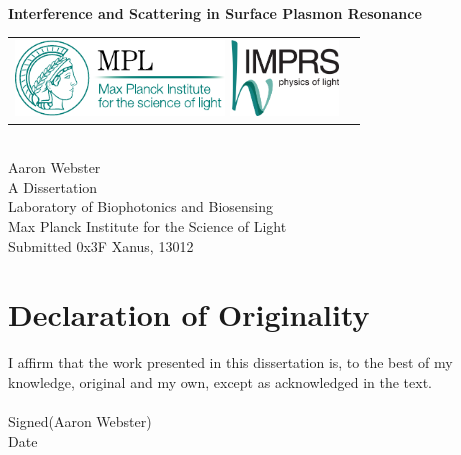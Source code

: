 \documentclass[a4paper]{report}
\begin{document}
\begin{titlepage}
\begin{center}
\hfill\\[4cm]
{ \Huge {\bfseries {Interference and Scattering in Surface Plasmon Resonance}} \par}
\vspace{3.0cm}
\begin{tabular}{lr}
\includegraphics[height=2cm,keepaspectratio]{logo/Logo_MPL_englisch_kompakt_cmyk_110915}
\hspace{1.0cm}
%
\includegraphics[height=2cm,keepaspectratio]{logo/Logo_IMPRS_4c_042012}
\end{tabular}
\vspace{3cm}
\\
{\Large Aaron Webster}\\
\vspace{1cm}
{\large A Dissertation}\\
\vspace{0.5cm}
Laboratory of Biophotonics and Biosensing\\
Max Planck Institute for the Science of Light\\
\vspace{0.5cm}
Submitted 0x3F Xanus, 13012
\end{center}
\end{titlepage}

\chapter*{Declaration of Originality}
I affirm that the work presented in this dissertation is, to the best of my
knowledge, original and my own, except as acknowledged in the
text. \\
\hfill\\[1cm]
Signed\hspace{0.25cm}\makebox[5cm]{\hrulefill}\hspace{0.25cm}(Aaron Webster)
\hfill\\[1cm]
Date\hspace{0.51cm}\makebox[5cm]{\hrulefill}\hspace{0.25cm}
\vspace{2cm}
\end{document}
